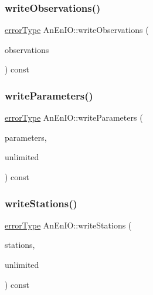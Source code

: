 \subsubsection{\texorpdfstring{write\+Observations()}{writeObservations()}}
{\footnotesize\ttfamily \mbox{\hyperlink{class_an_en_i_o_aa56bc1ec6610b86db4349bce20f9ead0}{error\+Type}} An\+En\+I\+O\+::write\+Observations (\begin{DoxyParamCaption}\item[{const \mbox{\hyperlink{class_observations}{Observations}} \&}]{observations }\end{DoxyParamCaption}) const}

\mbox{\label{class_an_en_i_o_a9ae88d089b2de16571085cb6f7f4cefb}} 
\subsubsection{\texorpdfstring{write\+Parameters()}{writeParameters()}}
{\footnotesize\ttfamily \mbox{\hyperlink{class_an_en_i_o_aa56bc1ec6610b86db4349bce20f9ead0}{error\+Type}} An\+En\+I\+O\+::write\+Parameters (\begin{DoxyParamCaption}\item[{const \mbox{\hyperlink{classanen_par_1_1_parameters}{anen\+Par\+::\+Parameters}} \&}]{parameters,  }\item[{bool}]{unlimited }\end{DoxyParamCaption}) const}

\mbox{\label{class_an_en_i_o_ac4cb6e66c0661eff0a10dcc3cb3324e8}} 
\subsubsection{\texorpdfstring{write\+Stations()}{writeStations()}}
{\footnotesize\ttfamily \mbox{\hyperlink{class_an_en_i_o_aa56bc1ec6610b86db4349bce20f9ead0}{error\+Type}} An\+En\+I\+O\+::write\+Stations (\begin{DoxyParamCaption}\item[{const \mbox{\hyperlink{classanen_sta_1_1_stations}{anen\+Sta\+::\+Stations}} \&}]{stations,  }\item[{bool}]{unlimited }\end{DoxyParamCaption}) const}

